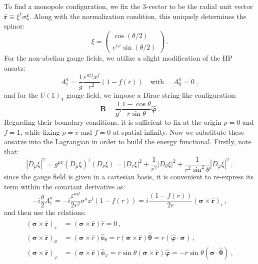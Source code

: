 \documentclass[a4paper,11pt]{article}
\begin{document}
To find a monopole configuration, we fix the 3-vector to be the radial unit vector $\hat{\boldsymbol r} \equiv \xi^\dagger \sigma \xi$. Along with the normalization condition, this uniquely determines the spinor:
\begin{equation}
\xi = \begin{pmatrix} \cos(\theta/2) \\ e^{i\varphi} \sin(\theta/2) \end{pmatrix}\ .
\end{equation}
For the non-abelian gauge fields, we utilize a slight modification of the HP ansatz:
\begin{equation}
    A_i^a = \frac{1}{g} \frac{\varepsilon^{aij}x^j}{r^2}(1-f(r)) \quad \text{with }\quad  A_0^a = 0\ ,
\end{equation}
and for the $U(1)_Y$ gauge field, we impose a Dirac string-like configuration:
\begin{equation}
    \boldsymbol{B} = \frac{1}{g'} \frac{1-\cos\theta}{r\sin\theta} \hat{\boldsymbol\varphi}\ .
\end{equation}
Regarding their boundary conditions, it is sufficient to fix at the origin $\rho=0$ and $f=1$, while fixing $\rho=v$ and $f=0$ at spatial infinity. Now we substitute these ansätze into the Lagrangian in order to build the energy functional. Firstly, note that:
\begin{equation}
    |D_\mu \xi|^2 = g^{\mu\nu} (D_\mu \xi)^\dagger (D_\nu \xi)= |D_r \xi|^2 + \frac{1}{r^2} |D_\theta \xi|^2 + \frac{1}{r^2\sin^2\theta} |D_\varphi \xi|^2\ ,
\end{equation}
since the gauge field is given in a cartesian basis, it is convenient to re-express its term within the covariant derivative as:
\begin{equation}
    -i \frac{g}{2} A_i^a = -i \frac{\varepsilon^{ail}}{2r^2} \sigma^a x^l (1-f(r))= i \frac{(1-f(r))}{2r} (\boldsymbol{\sigma}\times \hat{\boldsymbol r})_i\ ,
\end{equation}
and then use the relations:
\begin{align}
    \begin{split}
        (\boldsymbol{\sigma}\times\hat{\boldsymbol r})_r &= (\boldsymbol{\sigma}\times\hat{\boldsymbol r})\hat{r} = 0\ ,\\
        (\boldsymbol{\sigma}\times\hat{\boldsymbol r})_\theta &= (\boldsymbol{\sigma}\times\hat{r})\hat{\boldsymbol e}_\theta = r(\boldsymbol{\sigma}\times\hat{\boldsymbol r})\hat{\boldsymbol \theta} = r(\hat{\boldsymbol \varphi}\cdot\boldsymbol{\sigma})\ ,\\(\boldsymbol{\sigma}\times\hat{\boldsymbol r})_\varphi &= (\boldsymbol{\sigma}\times\hat{\boldsymbol r})\hat{\boldsymbol e}_\varphi = r\sin\theta (\boldsymbol{\sigma}\times\hat{\boldsymbol r})\hat{\boldsymbol \varphi} = -r\sin\theta (\boldsymbol{\sigma}\cdot\hat{\boldsymbol \theta})\ ,
    \end{split}
\end{align}
\end{document}
